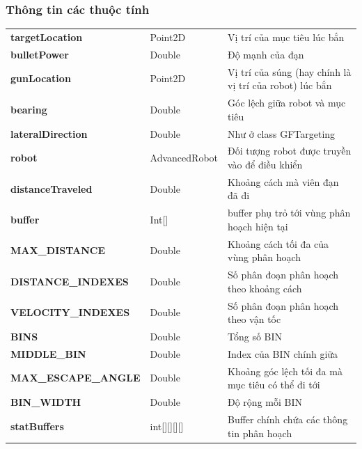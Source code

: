 \documentclass[14pt]{article}
\begin{document}
\subsubsection{Thông tin các thuộc tính}
\begin{tabular}{llp{5cm}}
\textbf{targetLocation}&Point2D&Vị trí của mục tiêu lúc bắn\\
\textbf{bulletPower}&Double&Độ mạnh của đạn\\
\textbf{gunLocation}&Point2D&Vị trí của súng (hay chính là vị trí của robot) lúc bắn\\
\textbf{bearing}&Double&Góc lệch giữa robot và mục tiêu\\
\textbf{lateralDirection}&Double&Như ở class GFTargeting\\
\textbf{robot}&AdvancedRobot&Đối tượng robot được truyền vào để điều khiển\\
\textbf{distanceTraveled}&Double&Khoảng cách mà viên đạn đã đi\\
\textbf{buffer}&Int[]&buffer phụ trỏ tới vùng phân hoạch hiện tại\\
\textbf{MAX_DISTANCE}&Double&Khoảng cách tối đa của vùng phân hoạch\\
\textbf{DISTANCE_INDEXES}&Double&Số phân đoạn phân hoạch theo khoảng cách\\
\textbf{VELOCITY_INDEXES}&Double&Số phân đoạn phân hoạch theo vận tốc\\
\textbf{BINS}&Double&Tổng số BIN\\
\textbf{MIDDLE_BIN}&Double&Index của BIN chính giữa\\
\textbf{MAX_ESCAPE_ANGLE}&Double&Khoảng góc lệch tối đa mà mục tiêu có thể đi tới\\
\textbf{BIN_WIDTH}&Double&Độ rộng mỗi BIN\\
\textbf{statBuffers}&int[][][][]&Buffer chính chứa các thông tin phân hoạch\\
\end{tabular}
\end{document}
